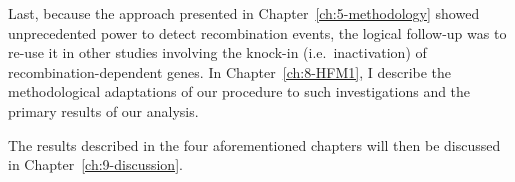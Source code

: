Last, because the approach presented in Chapter~\ref{ch:5-methodology} showed unprecedented power to detect recombination events, the logical follow-up was to re-use it in other studies involving the knock-in (i.e.\ inactivation) of recombination-dependent genes.
In Chapter~\ref{ch:8-HFM1}, I describe the methodological adaptations of our procedure to such investigations and the primary results of our analysis.

The results described in the four aforementioned chapters will then be discussed in Chapter~\ref{ch:9-discussion}.



